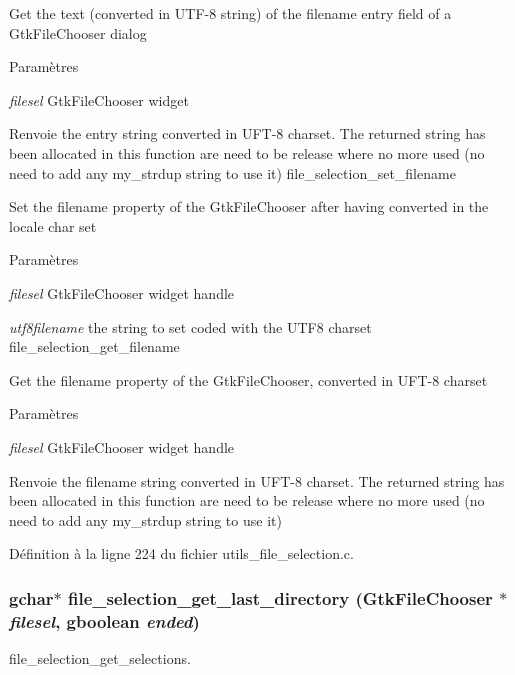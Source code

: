 Get the text (converted in UTF-\/8 string) of the filename entry field of a GtkFileChooser dialog


\begin{DoxyParams}{Paramètres}
\item[{\em filesel}]GtkFileChooser widget\end{DoxyParams}
\begin{DoxyReturn}{Renvoie}
the entry string converted in UFT-\/8 charset. The returned string has been allocated in this function are need to be release where no more used (no need to add any my\_\-strdup string to use it) file\_\-selection\_\-set\_\-filename
\end{DoxyReturn}
Set the filename property of the GtkFileChooser after having converted in the locale char set


\begin{DoxyParams}{Paramètres}
\item[{\em filesel}]GtkFileChooser widget handle \item[{\em utf8filename}]the string to set coded with the UTF8 charset file\_\-selection\_\-get\_\-filename\end{DoxyParams}
Get the filename property of the GtkFileChooser, converted in UFT-\/8 charset


\begin{DoxyParams}{Paramètres}
\item[{\em filesel}]GtkFileChooser widget handle \end{DoxyParams}
\begin{DoxyReturn}{Renvoie}
the filename string converted in UFT-\/8 charset. The returned string has been allocated in this function are need to be release where no more used (no need to add any my\_\-strdup string to use it) 
\end{DoxyReturn}


Définition à la ligne 224 du fichier utils\_\-file\_\-selection.c.

\subsubsection[{file\_\-selection\_\-get\_\-last\_\-directory}]{\setlength{\rightskip}{0pt plus 5cm}gchar$\ast$ file\_\-selection\_\-get\_\-last\_\-directory (GtkFileChooser $\ast$ {\em filesel}, \/  gboolean {\em ended})}\label{utils__file__selection_8h_a7ceee035264e3ea82cd7e5863650a6c3}
file\_\-selection\_\-get\_\-selections.



